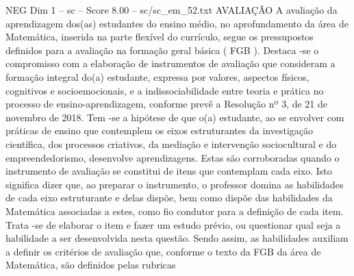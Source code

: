 \begin{textsample}{NEG Dim 1 – sc – Score 8.00 – sc/sc\_em\_52.txt}  \label{ex:f1_neg_276}
AVALIAÇÃO A avaliação da aprendizagem dos(as) estudantes do ensino médio, no aprofundamento da área de Matemática, inserida na parte flexível do currículo, segue os pressupostos definidos para a avaliação na formação geral básica ( FGB ).
Destaca -se o compromisso com a elaboração de instrumentos de avaliação que consideram a formação integral do(a) estudante, expressa por valores, aspectos físicos, cognitivos e socioemocionais, e a indissociabilidade entre teoria e prática no processo de ensino-aprendizagem, conforme prevê a Resolução nº 3, de 21 de novembro de 2018.
Tem -se a hipótese de que o(a) estudante, ao se envolver com práticas de ensino que contemplem os eixos estruturantes da investigação científica, dos processos criativos, da mediação e intervenção sociocultural e do empreendedorismo, desenvolve aprendizagens.
Estas são corroboradas quando o instrumento de avaliação se constitui de itens que contemplam cada eixo.
Isto significa dizer que, ao preparar o instrumento, o professor domina as habilidades de cada eixo estruturante e delas dispõe, bem como dispõe das habilidades da Matemática associadas a estes, como fio condutor para a definição de cada item.
Trata -se de elaborar o item e fazer um estudo prévio, ou questionar qual seja a habilidade a ser desenvolvida nesta questão.
Sendo assim, as habilidades auxiliam a definir os critérios de avaliação que, conforme o texto da FGB da área de Matemática, são definidos pelas rubricas

\end{textsample}
